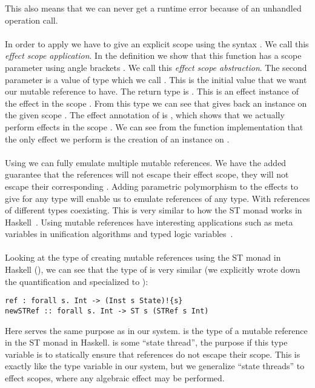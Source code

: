 This also means that we can never get a runtime error because of an unhandled operation call.
\\\\
In order to apply  we have to give an explicit scope  using the syntax .
We call this \emph{effect scope application}.
In the definition we show that this function has a scope parameter using angle brackets \ident{[s]}.
We call this \emph{effect scope abstraction}.
The second parameter is a value of type  which we call .
This is the initial value that we want our mutable reference to have.
The return type is .
This is an effect instance of the  effect in the scope .
From this type we can see that  gives back an instance on the given scope .
The effect annotation of  is , which shows that we actually perform effects in the scope .
We can see from the function implementation that the only effect we perform is the creation of an instance on .
\\\\
Using  we can fully emulate multiple mutable references.
We have the added guarantee that the references will not escape their effect scope, they will not escape their corresponding .
Adding parametric polymorphism to the effects to give  for any type  will enable us to emulate references of any type.
With references of different types coexisting.
This is very similar to how the ST monad works in Haskell~\cite{runst}.
Using mutable references have interesting applications such as meta variables in unification algorithms and typed logic variables~\cite{typedlogic}.
\\\\
Looking at the type of creating mutable references using the ST monad in Haskell (), we can see that the type of  is very similar
(we explicitly wrote down the quantification and specialized  to ):

\begin{verbatim}
ref : forall s. Int -> (Inst s State)!{s}
newSTRef :: forall s. Int -> ST s (STRef s Int)
\end{verbatim}

Here  serves the same purpose as  in our system.
 is the type of a mutable reference in the ST monad in Haskell.
 is some ``state thread'', the purpose if this type variable is to statically ensure that references do not escape their scope.
This is exactly like the  type variable in our system, but we generalize ``state threads'' to effect scopes, where any algebraic effect may be performed.


